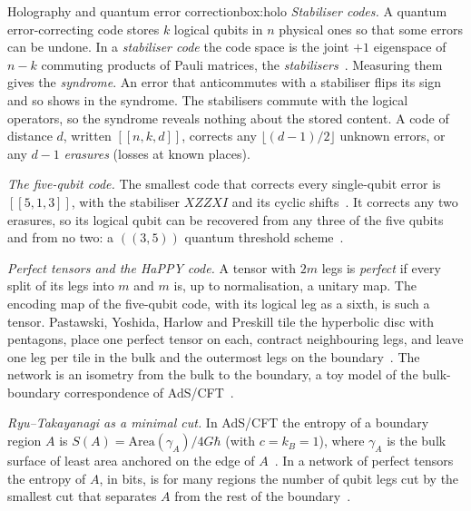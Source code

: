 \begin{primer}{Holography and quantum error correction}{box:holo}
\setlength{\parskip}{3pt plus 1pt}%
\emph{Stabiliser codes.} A quantum error-correcting code stores $k$ logical qubits in $n$ physical ones so that some errors can be
undone. In a \emph{stabiliser code} the code space is the joint $+1$ eigenspace of $n-k$ commuting products of Pauli matrices, the
\emph{stabilisers}~\cite{gottesman1997}. Measuring them gives the \emph{syndrome}. An error that anticommutes with a stabiliser flips its
sign and so shows in the syndrome. The stabilisers commute with the logical operators, so the syndrome reveals nothing about the stored
content. A code of distance $d$, written $[[n,k,d]]$, corrects any $\lfloor(d-1)/2\rfloor$ unknown errors, or any $d-1$
\emph{erasures} (losses at known places).

\emph{The five-qubit code.} The smallest code that corrects every single-qubit error is $[[5,1,3]]$, with the stabiliser $XZZXI$ and its
cyclic shifts~\cite{laflamme,bennett1996}. It corrects any two erasures, so its logical qubit can be recovered from any three of the five
qubits and from no two: a $((3,5))$ quantum threshold scheme~\cite{cgl}.

\emph{Perfect tensors and the HaPPY code.} A tensor with $2m$ legs is \emph{perfect} if every split of its legs into $m$ and $m$ is, up to
normalisation, a unitary map. The encoding map of the five-qubit code, with its logical leg as a sixth, is such a tensor. Pastawski,
Yoshida, Harlow and Preskill tile the hyperbolic disc with pentagons, place one perfect tensor on each, contract neighbouring legs, and
leave one leg per tile in the bulk and the outermost legs on the boundary~\cite{happy}. The network is an isometry from the bulk to the
boundary, a toy model of the bulk-boundary correspondence of AdS/CFT~\cite{maldacena}.

\emph{Ryu--Takayanagi as a minimal cut.} In AdS/CFT the entropy of a boundary region $A$ is $S(A)=\mathrm{Area}(\gamma_A)/4G\hbar$ (with
$c=k_B=1$), where $\gamma_A$ is the bulk surface of least area anchored on the edge of $A$~\cite{rt}. In a network of perfect tensors the
entropy of $A$, in bits, is for many regions the number of qubit legs cut by the smallest cut that separates $A$ from the rest of the
boundary~\cite{happy}.


\end{primer}

